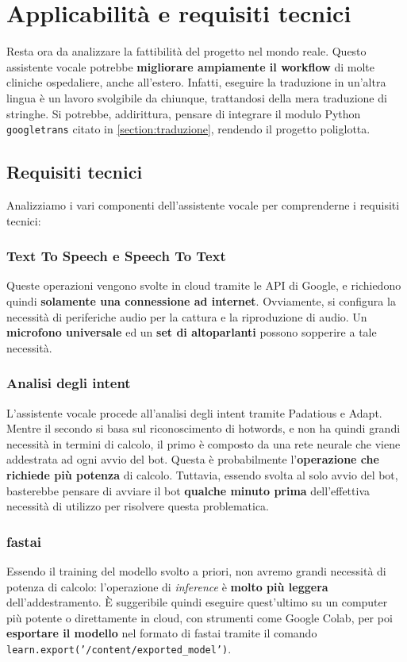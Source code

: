 \chapter{Applicabilità e requisiti tecnici}
\label{chap:applicabilita}
Resta ora da analizzare la fattibilità del progetto nel mondo reale. Questo assistente vocale potrebbe \textbf{migliorare ampiamente il workflow} di molte cliniche ospedaliere, anche all'estero. Infatti, eseguire la traduzione in un'altra lingua è un lavoro svolgibile da chiunque, trattandosi della mera traduzione di stringhe. Si potrebbe, addirittura, pensare di integrare il modulo Python \texttt{googletrans} citato in \ref{section:traduzione}, rendendo il progetto poliglotta.
\section{Requisiti tecnici}
Analizziamo i vari componenti dell'assistente vocale per comprenderne i requisiti tecnici:
\subsection{Text To Speech e Speech To Text}
Queste operazioni vengono svolte in cloud tramite le API di Google, e richiedono quindi \textbf{solamente una connessione ad internet}. Ovviamente, si configura la necessità di periferiche audio per la cattura e la riproduzione di audio. Un \textbf{microfono universale} ed un \textbf{set di altoparlanti} possono sopperire a tale necessità.
\subsection{Analisi degli intent}
L'assistente vocale procede all'analisi degli intent tramite Padatious e Adapt. Mentre il secondo si basa sul riconoscimento di hotwords, e non ha quindi grandi necessità in termini di calcolo, il primo è composto da una rete neurale che viene addestrata ad ogni avvio del bot. Questa è probabilmente l'\textbf{operazione che richiede più potenza} di calcolo. Tuttavia, essendo svolta al solo avvio del bot, basterebbe pensare di avviare il bot \textbf{qualche minuto prima} dell'effettiva necessità di utilizzo per risolvere questa problematica.
\subsection{fastai}
Essendo il training del modello svolto a priori, non avremo grandi necessità di potenza di calcolo: l'operazione di \textit{inference} è \textbf{molto più leggera} dell'addestramento. È suggeribile quindi eseguire quest'ultimo su un computer più potente o direttamente in cloud, con strumenti come Google Colab, per poi \textbf{esportare il modello} nel formato di fastai tramite il comando \texttt{learn.export('/content/exported\_model')}.
